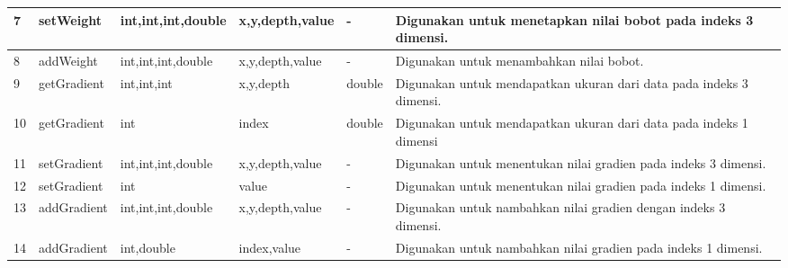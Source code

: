 \begin{small}
\begin{longtable}{|p{0.4cm}|p{2cm}|p{1.8cm}|p{1.8cm}|p{1.7cm}|p{3.55cm}|}
	\hline
	7 & setWeight & int,\newline int,\newline int,\newline double & x,\newline y,\newline depth,\newline value & - & Digunakan untuk menetapkan nilai bobot pada indeks 3 dimensi.\\
	\hline
	8 & addWeight & int,\newline int,\newline int,\newline double & x,\newline y,\newline depth,\newline value & - & Digunakan untuk menambahkan nilai bobot.\\
	\hline
	9 & getGradient & int,\newline int,\newline int & x,\newline y,\newline depth & double & Digunakan untuk mendapatkan ukuran dari data pada indeks 3 dimensi.\\
	\hline
	10 & getGradient & int & index & double & Digunakan untuk mendapatkan ukuran dari data pada indeks 1 dimensi\\
	\hline
	11 & setGradient & int,\newline int,\newline int,\newline double & x,\newline y,\newline depth,\newline value & - & Digunakan untuk menentukan nilai gradien pada indeks 3 dimensi.\\
	\hline
	12 & setGradient & int & value & - & Digunakan untuk menentukan nilai gradien pada indeks 1 dimensi.\\
	\hline
	13 & addGradient & int,\newline int,\newline int,\newline double & x,\newline y,\newline depth,\newline value & - & Digunakan untuk nambahkan nilai gradien dengan indeks 3 dimensi.\\
	\hline
	14 & addGradient & int,\newline double & index,\newline value & - & Digunakan untuk nambahkan nilai gradien pada indeks 1 dimensi.\\

\end{longtable}
\end{small}
